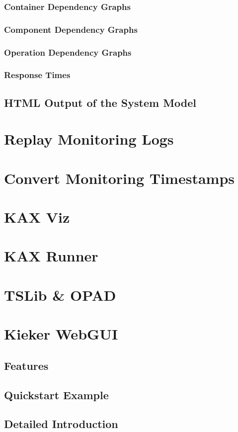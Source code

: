 			\subsubsection{Container Dependency Graphs}
			\subsubsection{Component Dependency Graphs}
			\subsubsection{Operation Dependency Graphs}
			\subsubsection{Response Times}
		\subsection{HTML Output of the System Model}	
			
	\section{Replay Monitoring Logs}
	\section{Convert Monitoring Timestamps}
	\section{KAX Viz}
	\section{KAX Runner}
	\section{TSLib \& OPAD}
	\newpage
	\section{Kieker WebGUI}\label{chp:Kieker-WebGUI}
		\subsection{Features}
		\subsection{Quickstart Example}
		\subsection{Detailed Introduction}